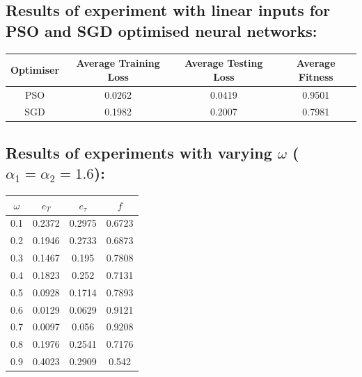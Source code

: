 \documentclass[12pt]{article}
\begin{document}
\subsection{Results of experiment with linear inputs for PSO and SGD optimised neural networks:}
\begin{center}
 \begin{tabular}{||c c c c||} 
 \hline
 Optimiser & Average Training Loss & Average Testing Loss & Average Fitness \\ [0.5ex] 
 \hline\hline
 PSO & 0.0262 & 0.0419 & 0.9501 \\ 
 \hline
 SGD & 0.1982 & 0.2007 & 0.7981 \\
 \hline
\end{tabular}
\end{center}
\subsection{Results of experiments with varying $\omega$ ($\alpha_1=\alpha_2=1.6$):}
\begin{center}
 \begin{tabular}{||c c c c||} 
 \hline
 $\omega$ & $e_T$ & $e_\tau$ & $f$ \\ [0.5ex] 
 \hline\hline
 0.1 & 0.2372 & 0.2975 & 0.6723 \\ 
 \hline
 0.2 & 0.1946 & 0.2733 & 0.6873 \\
 \hline
 0.3 & 0.1467 & 0.195 & 0.7808 \\
 \hline
 0.4 & 0.1823 & 0.252 & 0.7131 \\
 \hline
 0.5 & 0.0928 & 0.1714 & 0.7893 \\
 \hline
 0.6 & 0.0129 & 0.0629 & 0.9121 \\
 \hline
 0.7 & 0.0097 & 0.056 & 0.9208 \\
 \hline
 0.8 & 0.1976 & 0.2541 & 0.7176 \\
 \hline
 0.9 & 0.4023 & 0.2909 & 0.542 \\
 \hline
\end{tabular}
\end{center}
\end{document}
